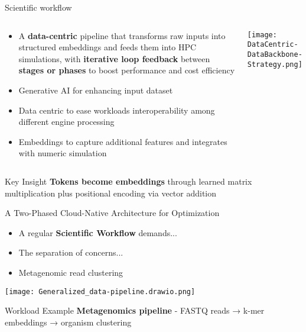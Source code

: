 \documentclass[aspectratio=169]{beamer}
\begin{document}
\begin{frame}{Scientific workflow}
    \begin{columns}
        \begin{column}{0.6\textwidth}
            \begin{itemize}
                \item A \textbf{data-centric} pipeline that transforms raw inputs into structured embeddings and feeds them into HPC simulations, with \textbf{iterative loop feedback} between \textbf{stages or phases} to boost performance and cost efficiency
                \item Generative AI for enhancing input dataset
                \item Data centric to ease workloads interoperability among different engine processing
                \item Embeddings to capture additional features and integrates with numeric simulation
            \end{itemize}
        \end{column}
        \begin{column}{0.4\textwidth}
            \texttt{[image: DataCentric-DataBackbone-Strategy.png]}
        \end{column}
    \end{columns}
    
    \vspace{0.3cm}
    \begin{block}{Key Insight}
        \textbf {Tokens become embeddings} through learned matrix multiplication plus positional encoding via vector addition
    \end{block}
\end{frame}

\begin{frame}{A Two-Phased Cloud-Native Architecture for Optimization}
    \begin{itemize}
        \item A regular \textbf{Scientific Workflow} demands... 
        \item The separation of concerns...
        \item Metagenomic read clustering 
    \end{itemize}
    
    \vspace{0.4cm}
    
    \begin{center}
        \texttt{[image: Generalized\_data-pipeline.drawio.png]}
    \end{center}
    
    \vspace{0.3cm}
    \begin{block}{Workload Example}
        \textbf{Metagenomics pipeline}  - FASTQ reads → k-mer embeddings → organism clustering
    \end{block}
\end{frame}
\end{document}
